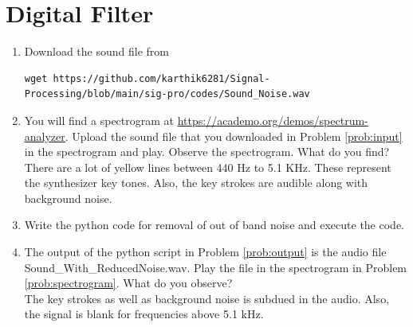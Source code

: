 \documentclass[journal,12pt,twocolumn]{IEEEtran}
\renewcommand\thesection{\arabic{section}}
\begin{document}
\section{Digital Filter}
\begin{enumerate}[label=\thesection.\arabic*
,ref=\thesection.\theenumi]
\item
\label{prob:input}
Download the sound file from  
\begin{lstlisting}
wget https://github.com/karthik6281/Signal-Processing/blob/main/sig-pro/codes/Sound_Noise.wav
\end{lstlisting}
\item
\label{prob:spectrogram}
You will find a spectrogram at \href{https://academo.org/demos/spectrum-analyzer}{\url{https://academo.org/demos/spectrum-analyzer}}. 
%
Upload the sound file that you downloaded in Problem \ref{prob:input} in the spectrogram  and play.  Observe the spectrogram. What do you find?
\\
%
\solution There are a lot of yellow lines between 440 Hz to 5.1 KHz.  These represent the synthesizer key tones. Also, the key strokes
are audible along with background noise.
\item
\label{prob:output}
Write the python code for removal of out of band noise and execute the code.
\\
\solution

%
\item
The output of the python script in Problem \ref{prob:output} is the audio file Sound\_With\_ReducedNoise.wav. Play the file in the spectrogram in Problem \ref{prob:spectrogram}. What do you observe?
\\
\solution The key strokes as well as background noise is subdued in the audio.  Also,  the signal is blank for frequencies above 5.1 kHz.

\end{enumerate}
\end{document}
